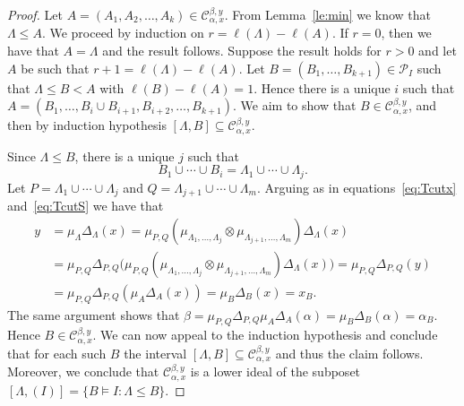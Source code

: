 \begin{proof} Let $A=(A_1,A_2,\ldots,A_k)\in \mathcal{C}_{\alpha,x}^{\beta,y}$. From Lemma~\ref{le:min} we know that $\Lambda\le A$. We proceed by induction on $r = \ell(\Lambda)-\ell(A)$.
If $r=0$, then we have that $A=\Lambda$ and the result follows.
Suppose the result holds for $r>0$ and let $A$ be such that $r+1= \ell(\Lambda)-\ell(A)$. Let $B=(B_1,\dots,B_{k+1})\in \mathcal{P}_I$ such that $\Lambda\leq B< A$ with $\ell(B)-\ell(A)=1$. Hence there is a unique $i$ such that $A=(B_1,\ldots,B_i\cup B_{i+1},B_{i+2},\ldots,B_{k+1})$. We aim to show that $B\in\mathcal{C}_{\alpha,x}^{\beta,y}$, and then by induction hypothesis $[\Lambda,B]\subseteq \mathcal{C}_{\alpha,x}^{\beta,y}$. 

Since $\Lambda\le B$, there is a unique $j$ such that 
 $$ B_1\cup\cdots\cup B_i=\Lambda_1\cup\cdots\cup \Lambda_j.$$
Let $P=\Lambda_1\cup\cdots\cup \Lambda_j$ and $Q=\Lambda_{j+1}\cup\cdots\cup \Lambda_m$. Arguing as in equations~\eqref{eq:Tcutx} and~\eqref{eq:TcutS} we have that 
 $$
 \begin{aligned}
 y&=\mu_\Lambda\Delta_\Lambda(x)=\mu_{P,Q}(\mu_{\Lambda_1,\ldots, \Lambda_j}\otimes \mu_{\Lambda_{j+1},\ldots, \Lambda_m})\Delta_\Lambda(x)\\
 &=\mu_{P,Q}\Delta_{P,Q}\big(\mu_{P,Q}(\mu_{\Lambda_1,\ldots, \Lambda_j}\otimes \mu_{\Lambda_{j+1},\ldots, \Lambda_m})\Delta_\Lambda(x)\big)
 =\mu_{P,Q}\Delta_{P,Q}(y)\\
 &=\mu_{P,Q}\Delta_{P,Q}(\mu_A\Delta_A(x))= \mu_B\Delta_B(x)=x_B.
 \end{aligned}
 $$
 The same argument shows that $\beta=\mu_{P,Q}\Delta_{P,Q}\mu_A\Delta_A(\alpha)= \mu_B\Delta_B(\alpha)=\alpha_B$. Hence $B\in \mathcal{C}_{\alpha,x}^{\beta,y}$. We can now appeal to the induction hypothesis and conclude that for each such $B$ the interval $[\Lambda,B]\subseteq \mathcal{C}_{\alpha,x}^{\beta,y}$ and thus the claim follows. Moreover, we conclude that $\mathcal{C}_{\alpha,x}^{\beta,y}$ is a lower ideal of the subposet
 $[\Lambda,(I)]=\{B\models I : \Lambda \le B\}$.
\end{proof}

